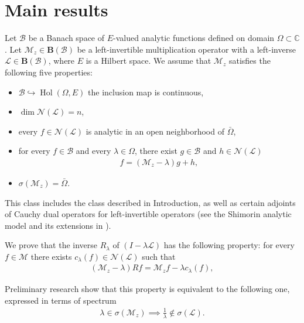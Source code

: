 \documentclass[reqno]{amsproc}
\DeclareMathOperator{\hol}{Hol}
\numberwithin{equation}{section}
\theoremstyle{remark}
\newcommand*{\mcal}{\mathcal{M}}
\newcommand*{\nul}{\mathscr{N}}
\newcommand*{\comp}{\mathbb{C}}
\newcommand*{\bou}{\boldsymbol{B}}
\theoremstyle{definition}
\newcommand{\lein}{\mathcal{L}}
\newcommand{\mul}{\mathcal{M}_z}
\newcommand{\bspace}{\mathcal{B}}
\begin{document}
\section{Main results}
  Let $\bspace$ be a Banach space of $E$-valued analytic functions defined on domain $\varOmega\subset \comp$. Let $\mul\in \bou(\bspace)$ be  a left-invertible multiplication operator  with a left-inverse $\lein\in \bou(\bspace)$, where $E$ is a Hilbert space. We assume that $ \mul$ satisfies the
following five properties:
\begin{itemize}
    \item $\bspace \hookrightarrow \hol(\varOmega, E)$ the inclusion map is 
continuous,
\item $\dim \nul(\lein)=n$,
\item every $f\in \nul(\lein)$ is analytic in an open neighborhood of $\bar\varOmega$,
\item for every $f\in \bspace$ and every $\lambda\in \varOmega$,
there exist $g\in \bspace$ and $h\in \nul(\lein)$
\begin{align*}
    f=(\mul-\lambda)g+h,
\end{align*}
\item $\sigma(\mul)=\bar{\varOmega}$.
\end{itemize}
This class includes the class described in Introduction, as well as certain adjoints of Cauchy dual operators for left-invertible operators (see the Shimorin analytic model \cite{S01}  and its extensions in \cite{ ja3}).

 We prove that the inverse $R_\lambda$ of $(I-\lambda\lein)$ has the following property: for every $f\in \mcal$ there exists $c_\lambda(f)\in \nul(\lein)$ such that
    \begin{align}\label{kluuu}
         (\mul-\lambda)Rf=\mul f-\lambda c_\lambda(f),
    \end{align}

 
Preliminary research show that this property is equivalent to the following one, expressed in terms of spectrum
\begin{align*}
    \lambda\in \sigma(\mul)\implies \frac{1}{\lambda}\notin \sigma(\lein).
\end{align*}
\end{document}
